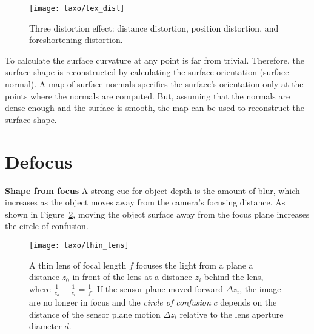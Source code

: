 \begin{figure}[h]
\centering
\texttt{[image: taxo/tex\_dist]}
\caption{Three distortion effect: distance distortion, position distortion, and foreshortening distortion.}
\label{fig:tex_dist}
\end{figure}

To calculate the surface curvature at any point is far from trivial. Therefore, the surface shape is reconstructed by calculating the surface orientation (surface normal). A map of surface normals specifies the surface's orientation only at the points where the normals are computed. But, assuming that the normals are dense enough and the surface is smooth, the map can be used to reconstruct the surface shape.

\section{Defocus}
\textbf{Shape from focus}
A strong cue for object depth is the amount of blur, which increases as the object moves away from the camera's focusing distance. As shown in Figure~\ref{fig:thin_lens}, moving the object surface away from the focus plane increases the circle of confusion.

\begin{figure}[h]
\centering
\texttt{[image: taxo/thin\_lens]}
\caption{A thin lens of focal length $f$ focuses the light from a plane a distance $z_0$ in front of the lens at a distance $z_i$ behind the lens, where $\frac{1}{z_o}+\frac{1}{z_i}=\frac{1}{f}$. If the sensor plane moved forward $\Delta z_i$, the image are no longer in focus and the \textit{circle of confusion} $c$ depends on the distance of the sensor plane motion $\Delta z_i$ relative to the lens aperture diameter $d$.}
\label{fig:thin_lens}
\end{figure}


